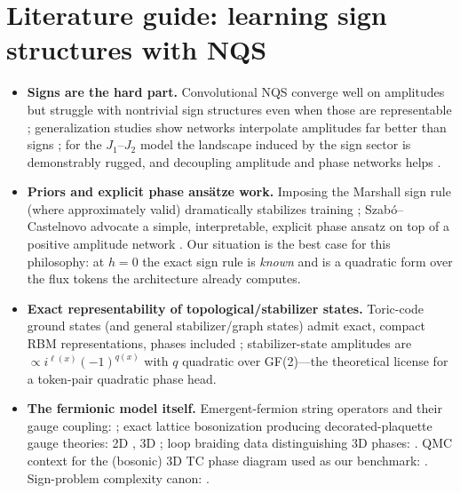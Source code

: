 \documentclass[11pt]{article}
\begin{document}
\section{Literature guide: learning sign structures with NQS}

\begin{itemize}
\item \textbf{Signs are the hard part.} Convolutional NQS converge well on
amplitudes but struggle with nontrivial sign structures even when those are
representable \cite{SzaboCastelnovo2020}; generalization studies show networks
interpolate amplitudes far better than signs \cite{Westerhout2020}; for the
$J_1$--$J_2$ model the landscape induced by the sign sector is demonstrably
rugged, and decoupling amplitude and phase networks helps \cite{Bukov2021}.
\item \textbf{Priors and explicit phase ans\"atze work.} Imposing the Marshall
sign rule (where approximately valid) dramatically stabilizes training
\cite{ChooNeupertCarleo2019}; Szab\'o--Castelnovo advocate a simple,
interpretable, explicit phase ansatz on top of a positive amplitude network
\cite{SzaboCastelnovo2020}. Our situation is the best case for this
philosophy: at $h=0$ the exact sign rule is \emph{known} and is a quadratic
form over the flux tokens the architecture already computes.
\item \textbf{Exact representability of topological/stabilizer states.}
Toric-code ground states (and general stabilizer/graph states) admit exact,
compact RBM representations, phases included
\cite{DengLiDasSarma2017,Zheng2018}; stabilizer-state amplitudes are
$\propto i^{\ell(x)}(-1)^{q(x)}$ with $q$ quadratic over GF(2)---the
theoretical license for a token-pair quadratic phase head.
\item \textbf{The fermionic model itself.} Emergent-fermion string operators
and their gauge coupling: \cite{LevinWen2003}; exact lattice bosonization
producing decorated-plaquette gauge theories: 2D \cite{ChenKapustinRadicevic2018},
3D \cite{ChenKapustin2019}; loop braiding data distinguishing 3D phases:
\cite{WangLevin2014}. QMC context for the (bosonic) 3D TC phase diagram used
as our benchmark: \cite{Linsel2026}. Sign-problem complexity canon:
\cite{TroyerWiese2005,BravyiDiVincenzoOliveiraTerhal2008,MarvianLidarHen2019,
KlassenTerhal2019,Hangleiter2020,Hastings2016}.
\end{itemize}

\end{document}
